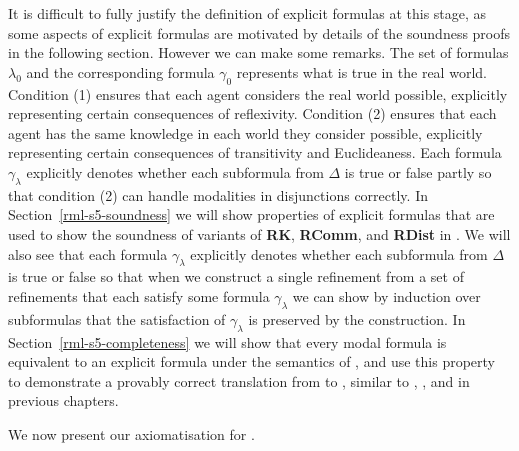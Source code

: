 It is difficult to fully justify the definition of explicit formulas at this stage, as some aspects of explicit formulas are motivated by details of the soundness proofs in the following section.
However we can make some remarks.
The set of formulas $\lambda_0$ and the corresponding formula $\gamma_0$ represents what is true in the real world.
Condition (1) ensures that each agent considers the real world possible, explicitly representing certain consequences of reflexivity.
Condition (2) ensures that each agent has the same knowledge in each world they consider possible, explicitly representing certain consequences of transitivity and Euclideaness.
Each formula $\gamma_\lambda$ explicitly denotes whether each subformula from $\Delta$ is true or false partly so that condition (2) can handle modalities in disjunctions correctly.
In Section~\ref{rml-s5-soundness} we will show properties of explicit formulas that are used to show the soundness of variants of {\bf RK}, {\bf RComm}, and {\bf RDist} in \logicRmlS{}.
We will also see that each formula $\gamma_\lambda$ explicitly denotes whether each subformula from $\Delta$ is true or false so that when we construct a single refinement from a set of refinements that each satisfy some formula $\gamma_\lambda$ we can show by induction over subformulas that the satisfaction of $\gamma_\lambda$ is preserved by the construction.
In Section~\ref{rml-s5-completeness} we will show that every modal formula is equivalent to an explicit formula under the semantics of \logicS{}, and use this property to demonstrate a provably correct translation from \langRml{} to \langMl{}, similar to \logicRmlK{}, \logicRmlKFF{}, and \logicRmlKD{} in previous chapters.

We now present our axiomatisation for \logicRmlS{}.

\pagebreak

